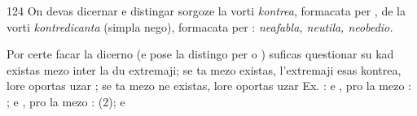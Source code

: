 \begin{VUpage}[128]{124}
On devas dicernar e distingar sorgoze la vorti \textit{kontrea},\nl
formacata per , de la vorti \textit{kontredicanta} (simpla nego),\nl
formacata per  : \textit{neafabla, neutila, neobedio.}

Por certe facar la dicerno (e pose la distingo per \nl
o ) suficas questionar su kad existas mezo inter la du\nl
extremaji; se ta mezo existas, l'extremaji esas kontrea, lore\nl
oportas uzar ; se ta mezo ne existas, lore oportas uzar\nl
{} Ex. :  e , pro la mezo : ; \nl
e , pro la mezo :  (2);  e 
\end{VUpage}

